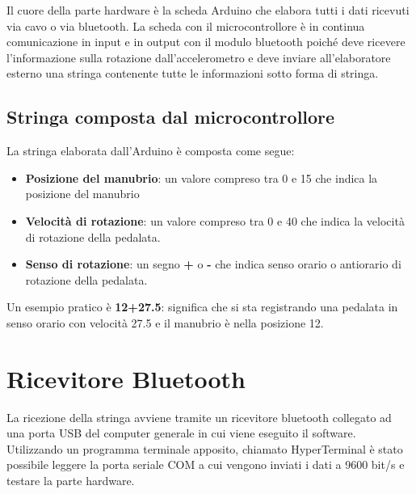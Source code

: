 Il cuore della parte hardware è la scheda Arduino che elabora tutti i dati ricevuti via cavo o via bluetooth. La scheda con il microcontrollore è in continua comunicazione in input e in output con il modulo bluetooth poiché deve ricevere l'informazione sulla rotazione dall'accelerometro e deve inviare all'elaboratore esterno una stringa contenente tutte le informazioni sotto forma di stringa.

\subsection{Stringa composta dal microcontrollore}
\label{stringa}
La stringa elaborata dall'Arduino è composta come segue:
\begin{itemize}
  \item \textbf{Posizione del manubrio}: un valore compreso tra 0 e 15 che indica la posizione del manubrio
  \item \textbf{Velocità di rotazione}: un valore compreso tra 0 e 40 che indica la velocità di rotazione della pedalata.
  \item \textbf{Senso di rotazione}: un segno \textbf{+} o \textbf{-} che indica senso orario o antiorario di rotazione della pedalata.
\end{itemize}

\noindent Un esempio pratico è \textbf{12+27.5}: significa che si sta registrando una pedalata in senso orario con velocità 27.5 e il manubrio è nella posizione 12.

\section{Ricevitore Bluetooth}
La ricezione della stringa avviene tramite un ricevitore bluetooth collegato ad una porta USB del computer generale in cui viene eseguito il software. Utilizzando un programma terminale apposito, chiamato HyperTerminal è stato possibile leggere la porta seriale COM a cui vengono inviati i dati a 9600 bit/s e testare la parte hardware.

